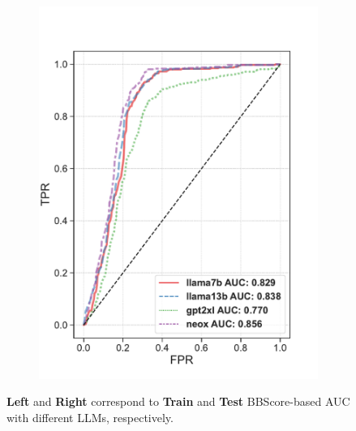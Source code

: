 \documentclass[letterpaper]{article}
\begin{document}
\begin{figure}[ht]
\begin{subfigure}[b]{0.48\linewidth}
\includegraphics[width=\linewidth,trim={0cm 0.8cm 1cm 1cm},clip]{pictures/AI_AUCtest.pdf}
\label{ai_auc_test}
\end{subfigure}
\caption{\textbf{Left} and \textbf{Right} correspond to \textbf{Train} and \textbf{Test} BBScore-based AUC with different LLMs, respectively.}
\label{ai_auc}
\end{figure}
\end{document}

